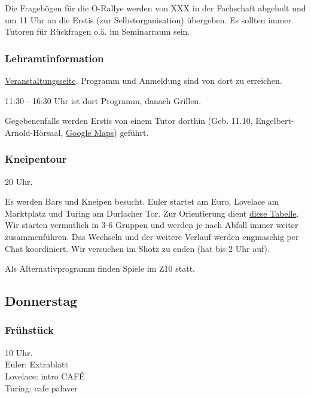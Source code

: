 \documentclass[10pt,ngerman]{scrartcl}
\begin{document}
\begin{multicols}{2}
Die Fragebögen für die O-Rallye werden von XXX in der Fachschaft
abgeholt und um 11 Uhr an die Erstis (zur Selbstorganisation) übergeben.
Es sollten immer Tutoren für Rückfragen o.ä. im Seminarraum sein.

\subsubsection{Lehramtinformation}\label{lehramt}

\href{https://www.hoc.kit.edu/zlb/Veranstaltungskalender.php/event/46988?}{Veranstaltungsseite}.
Programm und Anmeldung sind von dort zu erreichen.

11:30 - 16:30 Uhr ist dort Programm, danach Grillen.

Gegebenenfalls werden Erstis von einem Tutor dorthin (Geb. 11.10, Engelbert-Arnold-Hörsaal, \href{https://goo.gl/maps/R9WbmtbrKRxdziYY9}{Google Maps}) geführt.


\subsubsection{Kneipentour}

20 Uhr.

Es werden Bars und Kneipen besucht.
Euler startet am Euro, Lovelace am Marktplatz und Turing am Durlacher Tor.
Zur Orientierung dient \href{https://docs.google.com/spreadsheets/d/1Ea5M858ijKzbtYuySIMmbNUEUUtv-4jGpAmmq59vIvc/edit?usp=sharing}{diese Tabelle}.
Wir starten vermutlich in 3-6 Gruppen und werden je nach Abfall immer weiter zusammenführen.
Das Wechseln und der weitere Verlauf werden engmaschig per Chat koordiniert.
Wir versuchen im Shotz zu enden (hat bis 2 Uhr auf).

Als Alternativprogramm finden Spiele im Z10 statt.



\subsection{Donnerstag}

\subsubsection{Frühstück}

10 Uhr. \\
Euler: Extrablatt \\
Lovelace: intro CAFÉ \\
Turing: cafe palaver


\end{multicols}
\end{document}
